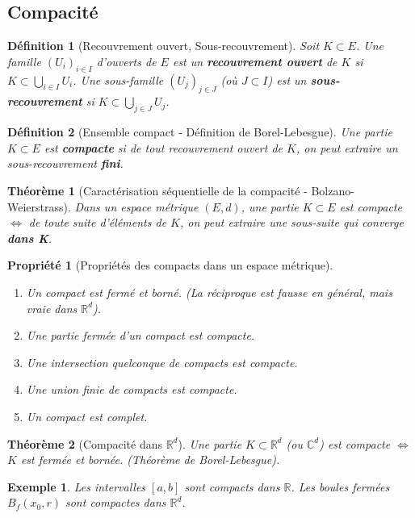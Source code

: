 \documentclass[a4paper]{article}
\newcommand{\R}{\mathbb{R}}
\newcommand{\C}{\mathbb{C}} %
\newtheorem{theorem}{Théorème}[section]
\newtheorem{definition}{Définition}[section]
\newtheorem{exemple}{Exemple}[section]
\newtheorem{propriete}{Propriété}[section] %
\begin{document}
\subsection{Compacité}
\begin{definition}[Recouvrement ouvert, Sous-recouvrement]
    Soit \(K \subset E\). Une famille \((U_i)_{i \in I}\) d'ouverts de \(E\) est un \textbf{recouvrement ouvert} de \(K\) si \(K \subset \bigcup_{i \in I} U_i\).
    Une sous-famille \((U_j)_{j \in J}\) (où \(J \subset I\)) est un \textbf{sous-recouvrement} si \(K \subset \bigcup_{j \in J} U_j\).
\end{definition}
\begin{definition}[Ensemble compact - Définition de Borel-Lebesgue]
    Une partie \(K \subset E\) est \textbf{compacte} si de tout recouvrement ouvert de \(K\), on peut extraire un sous-recouvrement \textbf{fini}.
\end{definition}
\begin{theorem}[Caractérisation séquentielle de la compacité - Bolzano-Weierstrass]
    Dans un espace métrique \((E,d)\), une partie \(K \subset E\) est compacte \(\iff\) de toute suite d'éléments de \(K\), on peut extraire une sous-suite qui converge \textbf{dans K}.
\end{theorem}
\begin{propriete}[Propriétés des compacts dans un espace métrique]
   \begin{enumerate}
       \item Un compact est fermé et borné. (La réciproque est fausse en général, mais vraie dans \(\R^d\)).
       \item Une partie fermée d'un compact est compacte.
       \item Une intersection quelconque de compacts est compacte.
       \item Une union finie de compacts est compacte.
       \item Un compact est complet.
   \end{enumerate}
\end{propriete}
\begin{theorem}[Compacité dans \(\R^d\)]
    Une partie \(K \subset \R^d\) (ou \(\C^d\)) est compacte \(\iff\) \(K\) est fermée et bornée.
    (Théorème de Borel-Lebesgue).
\end{theorem}
\begin{exemple}
    Les intervalles \([a,b]\) sont compacts dans \(\R\). Les boules fermées \(B_f(x_0, r)\) sont compactes dans \(\R^d\).
\end{exemple}
\end{document}
